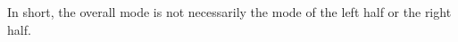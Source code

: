 \begin{prob}
\begin{subprobset}
\begin{subprob}
\begin{soln}
                    In short, the overall mode is not necessarily the mode of the left
                    half or the right half.
                \end{soln}

        \end{subprob}



    \end{subprobset}

\end{prob}
